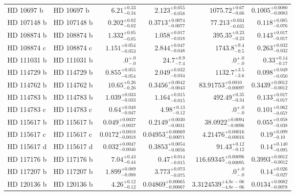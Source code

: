 \begin{longtable*}{llrrrr}
HD 10697 b & HD 10697 b & $6.21^{+0.33}_{-0.34}$ & $2.123^{+0.055}_{-0.058}$ & $1075.72^{+0.67}_{-0.66}$ & $0.1005^{+0.0080}_{-0.0083}$ \\ 
HD 107148 b & HD 107148 b & $0.202^{+0.02}_{-0.02}$ & $0.3713^{+0.0074}_{-0.0077}$ & $77.213^{+0.034}_{-0.035}$ & $0.118^{+0.085}_{-0.076}$ \\ 
HD 108874 b & HD 108874 b & $1.332^{+0.05}_{-0.05}$ & $1.058^{+0.017}_{-0.018}$ & $395.35^{+0.23}_{-0.23}$ & $0.143^{+0.017}_{-0.017}$ \\ 
HD 108874 c & HD 108874 c & $1.151^{+0.054}_{-0.053}$ & $2.844^{+0.047}_{-0.048}$ & $1743.8^{+9.4}_{-9.5}$ & $0.263^{+0.032}_{-0.032}$ \\ 
HD 111031 b & HD 111031 b & $.0^{+.0}_{-.0}$ & $24.7^{+8.9}_{-7.4}$ & $.0^{+.0}_{-.0}$ & $0.33^{+0.14}_{-0.17}$ \\ 
HD 114729 b & HD 114729 b & $0.855^{+0.055}_{-0.054}$ & $2.049^{+0.032}_{-0.034}$ & $1132.7^{+3.5}_{-3.6}$ & $0.098^{+0.049}_{-0.050}$ \\ 
HD 114762 b & HD 114762 b & $10.65^{+0.26}_{-0.26}$ & $0.3456^{+0.0042}_{-0.0043}$ & $83.91753^{+0.0010}_{-0.00097}$ & $0.3439^{+0.0012}_{-0.0012}$ \\ 
HD 114783 b & HD 114783 b & $1.039^{+0.033}_{-0.033}$ & $1.164^{+0.015}_{-0.015}$ & $492.49^{+0.35}_{-0.34}$ & $0.133^{+0.017}_{-0.017}$ \\ 
HD 114783 c & HD 114783 c & $0.64^{+0.048}_{-0.047}$ & $4.98^{+0.13}_{-0.12}$ & $.0^{+.0}_{-.0}$ & $0.101^{+0.062}_{-0.057}$ \\ 
HD 115617 b & HD 115617 b & $0.049^{+0.0037}_{-0.0037}$ & $0.2149^{+0.0030}_{-0.0031}$ & $38.0922^{+0.0094}_{-0.0096}$ & $0.055^{+0.058}_{-0.038}$ \\ 
HD 115617 c & HD 115617 c & $0.0172^{+0.0018}_{-0.0018}$ & $0.04953^{+0.00069}_{-0.00071}$ & $4.21476^{+0.00016}_{-0.00016}$ & $0.19^{+0.099}_{-0.10}$ \\ 
HD 115617 d & HD 115617 d & $0.032^{+0.0047}_{-0.0046}$ & $0.3853^{+0.0054}_{-0.0056}$ & $91.43^{+0.12}_{-0.12}$ & $0.14^{+0.140}_{-0.095}$ \\ 
HD 117176 b & HD 117176 b & $7.04^{+0.43}_{-0.44}$ & $0.47^{+0.014}_{-0.015}$ & $116.69345^{+0.00096}_{-0.00095}$ & $0.3993^{+0.0012}_{-0.0012}$ \\ 
HD 117207 b & HD 117207 b & $1.899^{+0.089}_{-0.088}$ & $3.773^{+0.073}_{-0.075}$ & $.0^{+.0}_{-.0}$ & $0.14^{+0.026}_{-0.027}$ \\ 
HD 120136 b & HD 120136 b & $4.26^{+0.12}_{-0.12}$ & $0.04869^{+0.00065}_{-0.00067}$ & $3.3124539^{+4.8e-06}_{-4.8e-06}$ & $0.0134^{+0.0082}_{-0.0078}$ \\ 

\end{longtable*}
